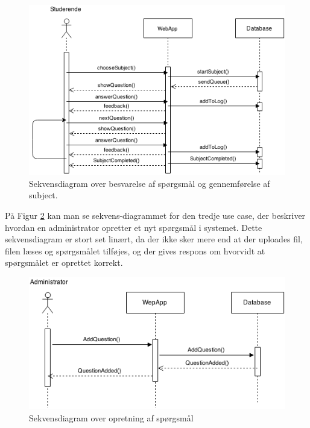 \documentclass[11pt, a4paper]{article}
\begin{document}
\begin{figure}[h]
    \centering
    \includegraphics[width=1\linewidth]{figures/SvarUseCase.png}
    \caption{Sekvensdiagram over besvarelse af spørgsmål og gennemførelse af subject.}
    \label{fig:svar_sekvens}
\end{figure}

På Figur \ref{fig:opret_sp_sekvens} kan man se sekvens-diagrammet for den tredje use case, der beskriver hvordan en administrator opretter et nyt spørgsmål i systemet. Dette sekvensdiagram er stort set linært, da der ikke sker mere end at der uploades fil, filen læses og spørgsmålet tilføjes, og der gives respons om hvorvidt at spørgsmålet er oprettet korrekt.

\begin{figure}[h]
    \centering
    \includegraphics[width=1\linewidth]{figures/OpretSporgsmalUseCase.png}
    \caption{Sekvensdiagram over opretning af spørgsmål}
    \label{fig:opret_sp_sekvens}
\end{figure}
\FloatBarrier
\end{document}
